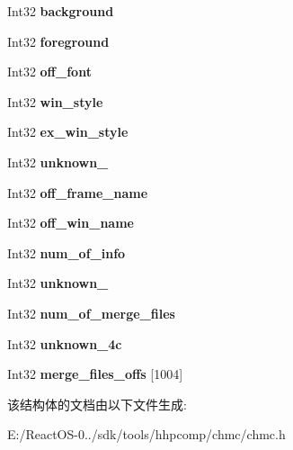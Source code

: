 \begin{DoxyCompactItemize}
Int32 {\bfseries background}
\item 
\mbox{\label{structchmc_index_header_aa6798714951dcf5d0bc96a69a47bcea6}} 
Int32 {\bfseries foreground}
\item 
\mbox{\label{structchmc_index_header_ab347ca1afe7d6bfc8ac6e294ced6bca6}} 
Int32 {\bfseries off\+\_\+font}
\item 
\mbox{\label{structchmc_index_header_a223739d7e6234dda44d06fb7169d62c3}} 
Int32 {\bfseries win\+\_\+style}
\item 
\mbox{\label{structchmc_index_header_a70e28eba2ef5ac553eeb85dcfb3429f5}} 
Int32 {\bfseries ex\+\_\+win\+\_\+style}
\item 
\mbox{\label{structchmc_index_header_aefd12dcb08597d5a9be05eba7185ebf2}} 
Int32 {\bfseries unknown\+\_}
\item 
\mbox{\label{structchmc_index_header_abda6336d3903435c1b9690ee503c3a55}} 
Int32 {\bfseries off\+\_\+frame\+\_\+name}
\item 
\mbox{\label{structchmc_index_header_ace3f4c45fa822f92f6b10d60c7264cd2}} 
Int32 {\bfseries off\+\_\+win\+\_\+name}
\item 
\mbox{\label{structchmc_index_header_af3675f37b7832e0f1379ce503951cdf7}} 
Int32 {\bfseries num\+\_\+of\+\_\+info}
\item 
\mbox{\label{structchmc_index_header_ab6a91930ba26055d1df0665e32102b0f}} 
Int32 {\bfseries unknown\+\_}
\item 
\mbox{\label{structchmc_index_header_a439101e0821a201c75d585c6dccddfa1}} 
Int32 {\bfseries num\+\_\+of\+\_\+merge\+\_\+files}
\item 
\mbox{\label{structchmc_index_header_a00d27289cc3e1400a0c9cf393cdf279a}} 
Int32 {\bfseries unknown\+\_\+4c}
\item 
\mbox{\label{structchmc_index_header_a2cd1dae2992a3842e1be454105b075e2}} 
Int32 {\bfseries merge\+\_\+files\+\_\+offs} \mbox{[}1004\mbox{]}
\end{DoxyCompactItemize}


该结构体的文档由以下文件生成\+:\begin{DoxyCompactItemize}
\item 
E\+:/\+React\+O\+S-\/0../sdk/tools/hhpcomp/chmc/chmc.\+h\end{DoxyCompactItemize}
